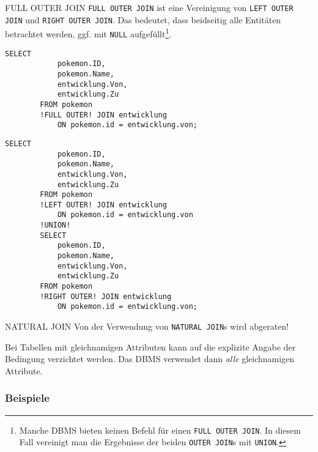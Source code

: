 \begin{sql}{FULL OUTER JOIN}
    \texttt{FULL OUTER JOIN} ist eine Vereinigung von \texttt{LEFT OUTER JOIN} und \texttt{RIGHT OUTER JOIN}.
    Das bedeutet, dass beidseitig alle Entitäten betrachtet werden, ggf. mit \texttt{NULL} aufgefüllt\footnote{
        Manche DBMS bieten keinen Befehl für einen \texttt{FULL OUTER JOIN}.
        In diesem Fall vereinigt man die Ergebnisse der beiden \texttt{OUTER JOIN}s mit \texttt{UNION}.}.

    \begin{lstlisting}[language=mysql]
        SELECT
            pokemon.ID,
            pokemon.Name,
            entwicklung.Von,
            entwicklung.Zu
        FROM pokemon
        !FULL OUTER! JOIN entwicklung
            ON pokemon.id = entwicklung.von;
    \end{lstlisting}

    \begin{lstlisting}[language=mysql]
        SELECT
            pokemon.ID,
            pokemon.Name,
            entwicklung.Von,
            entwicklung.Zu
        FROM pokemon
        !LEFT OUTER! JOIN entwicklung
            ON pokemon.id = entwicklung.von
        !UNION!
        SELECT
            pokemon.ID,
            pokemon.Name,
            entwicklung.Von,
            entwicklung.Zu
        FROM pokemon
        !RIGHT OUTER! JOIN entwicklung
            ON pokemon.id = entwicklung.von;
    \end{lstlisting}
\end{sql}

\begin{sqlbonus}{NATURAL JOIN}
    Von der Verwendung von \texttt{NATURAL JOIN}s wird abgeraten!

    Bei Tabellen mit gleichnamigen Attributen kann auf die explizite Angabe der Bedingung verzichtet werden.
    Das DBMS verwendet dann \emph{alle} gleichnamigen Attribute.
\end{sqlbonus}

\subsubsection{Beispiele}

